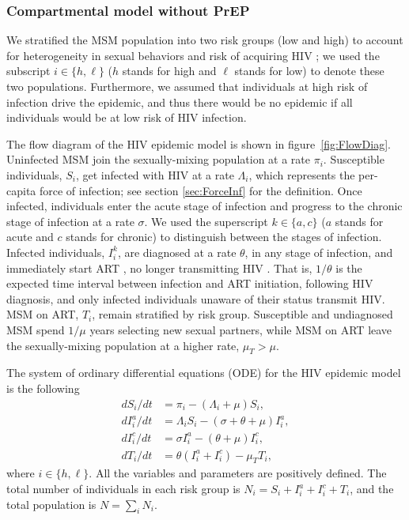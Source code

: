 \documentclass[12pt]{article}
\begin{document}
\subsubsection{Compartmental model without PrEP}

We stratified the MSM population into two risk groups (low and high) to account for heterogeneity in {sexual behaviors} and risk of acquiring HIV \cite{Jacquez1989}; we used the subscript $i\in\{h,\ell\}$ ($h$ stands for high and $\ell$ stands for low) to denote these two populations. Furthermore, we assumed that individuals at high risk of infection drive the epidemic, and thus there would be no epidemic if all individuals would be at low risk of HIV infection. 
		
The flow diagram of the HIV epidemic model is shown in figure~\ref{fig:FlowDiag}. Uninfected MSM join the sexually-mixing population at a rate $\pi_i$. Susceptible individuals, $S_i$, get infected with HIV at a rate $\Lambda_i$, which represents the per-capita force of infection; see section \ref{sec:ForceInf} for the definition. Once infected, individuals enter the acute stage of infection and progress to the chronic stage of infection at a rate $\sigma$. We used the superscript $k\in \{a,c\}$ ($a$ stands for acute and $c$ stands for chronic) to distinguish between the stages of infection. Infected individuals, $I_i^k$, are diagnosed at a rate $\theta$, in any stage of infection, and immediately start ART \cite{Dabis_IAS2019}, no longer transmitting HIV \cite{Rodger2016}. That is, {$1/\theta$ is the expected time interval between infection and ART initiation, following HIV diagnosis}, and only infected individuals unaware of their status transmit HIV. MSM on ART, $T_i$, remain stratified by risk group. Susceptible and undiagnosed MSM spend $1/\mu$ years selecting new sexual partners, while MSM on ART leave the sexually-mixing population at a higher rate, $\mu_T > \mu$. 

The system of ordinary differential equations (ODE) for the HIV epidemic model is the following
\begin{equation} \label{eq:ODEsys}
\begin{aligned}
        dS_i/dt 		& = \pi_i - \left( \Lambda_i + \mu \right) S_i, \\ 
        dI_i^a/dt 		& = \Lambda_i S_i - \left( \sigma + \theta + \mu \right) I_i^a, \\
        dI_i^c/dt 		& = \sigma I_i^a - (\theta +\mu) I_i^c, \\
        dT_i/dt 		& = \theta \left(I_i^a + I_i^c \right) - \mu_T T_i,
\end{aligned}
\end{equation}
where $i \in\{h,\ell\}$. All the variables and parameters are positively defined. The total number of individuals in each risk group is $N_i = S_i + I_i^a + I_i^c + T_i$, and the total population is $N = \sum_i N_i$. 
\end{document}

